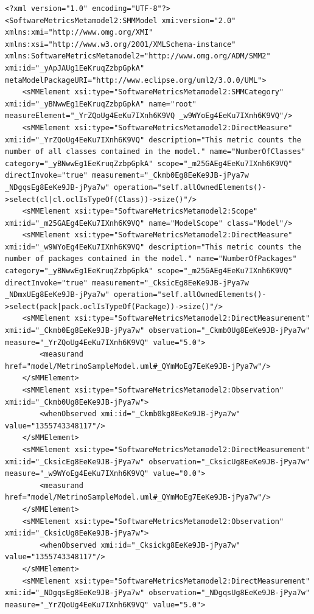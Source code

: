 \begin{verbatim}
<?xml version="1.0" encoding="UTF-8"?>
<SoftwareMetricsMetamodel2:SMMModel xmi:version="2.0" xmlns:xmi="http://www.omg.org/XMI" xmlns:xsi="http://www.w3.org/2001/XMLSchema-instance" xmlns:SoftwareMetricsMetamodel2="http://www.omg.org/ADM/SMM2" xmi:id="_yApJAUg1EeKruqZzbpGpkA" metaModelPackageURI="http://www.eclipse.org/uml2/3.0.0/UML">
    <sMMElement xsi:type="SoftwareMetricsMetamodel2:SMMCategory" xmi:id="_yBNwwEg1EeKruqZzbpGpkA" name="root" measureElement="_YrZQoUg4EeKu7IXnh6K9VQ _w9WYoEg4EeKu7IXnh6K9VQ"/>
    <sMMElement xsi:type="SoftwareMetricsMetamodel2:DirectMeasure" xmi:id="_YrZQoUg4EeKu7IXnh6K9VQ" description="This metric counts the number of all classes contained in the model." name="NumberOfClasses" category="_yBNwwEg1EeKruqZzbpGpkA" scope="_m25GAEg4EeKu7IXnh6K9VQ" directInvoke="true" measurement="_Ckmb0Eg8EeKe9JB-jPya7w _NDgqsEg8EeKe9JB-jPya7w" operation="self.allOwnedElements()->select(cl|cl.oclIsTypeOf(Class))->size()"/>
    <sMMElement xsi:type="SoftwareMetricsMetamodel2:Scope" xmi:id="_m25GAEg4EeKu7IXnh6K9VQ" name="ModelScope" class="Model"/>
    <sMMElement xsi:type="SoftwareMetricsMetamodel2:DirectMeasure" xmi:id="_w9WYoEg4EeKu7IXnh6K9VQ" description="This metric counts the number of packages contained in the model." name="NumberOfPackages" category="_yBNwwEg1EeKruqZzbpGpkA" scope="_m25GAEg4EeKu7IXnh6K9VQ" directInvoke="true" measurement="_CksicEg8EeKe9JB-jPya7w _NDmxUEg8EeKe9JB-jPya7w" operation="self.allOwnedElements()->select(pack|pack.oclIsTypeOf(Package))->size()"/>
    <sMMElement xsi:type="SoftwareMetricsMetamodel2:DirectMeasurement" xmi:id="_Ckmb0Eg8EeKe9JB-jPya7w" observation="_Ckmb0Ug8EeKe9JB-jPya7w" measure="_YrZQoUg4EeKu7IXnh6K9VQ" value="5.0">
        <measurand href="model/MetrinoSampleModel.uml#_QYmMoEg7EeKe9JB-jPya7w"/>
    </sMMElement>
    <sMMElement xsi:type="SoftwareMetricsMetamodel2:Observation" xmi:id="_Ckmb0Ug8EeKe9JB-jPya7w">
        <whenObserved xmi:id="_Ckmb0kg8EeKe9JB-jPya7w" value="1355743348117"/>
    </sMMElement>
    <sMMElement xsi:type="SoftwareMetricsMetamodel2:DirectMeasurement" xmi:id="_CksicEg8EeKe9JB-jPya7w" observation="_CksicUg8EeKe9JB-jPya7w" measure="_w9WYoEg4EeKu7IXnh6K9VQ" value="0.0">
        <measurand href="model/MetrinoSampleModel.uml#_QYmMoEg7EeKe9JB-jPya7w"/>
    </sMMElement>
    <sMMElement xsi:type="SoftwareMetricsMetamodel2:Observation" xmi:id="_CksicUg8EeKe9JB-jPya7w">
        <whenObserved xmi:id="_Cksickg8EeKe9JB-jPya7w" value="1355743348117"/>
    </sMMElement>
    <sMMElement xsi:type="SoftwareMetricsMetamodel2:DirectMeasurement" xmi:id="_NDgqsEg8EeKe9JB-jPya7w" observation="_NDgqsUg8EeKe9JB-jPya7w" measure="_YrZQoUg4EeKu7IXnh6K9VQ" value="5.0">

\end{verbatim}
